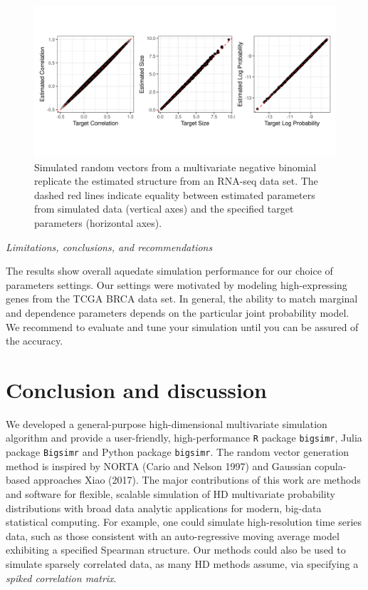 \documentclass{article}
\begin{document}
\begin{figure}
\includegraphics[width=0.8\linewidth]{ch050-figBRCA} \caption{\label{fig:ch050-figBRCA}Simulated random vectors from a multivariate negative binomial replicate the estimated structure from an RNA-seq data set. The dashed red lines indicate equality between estimated parameters from simulated data (vertical axes) and the specified target parameters (horizontal axes).}\label{fig:ch050-figBRCA}
\end{figure}

\emph{Limitations, conclusions, and recommendations}

The results show overall aquedate simulation performance for our choice
of parameters settings. Our settings were motivated by modeling
high-expressing genes from the TCGA BRCA data set. In general, the
ability to match marginal and dependence parameters depends on the
particular joint probability model. We recommend to evaluate and tune
your simulation until you can be assured of the accuracy.

\hypertarget{discussion}{%
\section{Conclusion and discussion}\label{discussion}}

We developed a general-purpose high-dimensional multivariate simulation
algorithm and provide a user-friendly, high-performance \texttt{R}
package \texttt{bigsimr}, Julia package \texttt{Bigsimr} and Python
package \texttt{bigsimr}. The random vector generation method is
inspired by NORTA (Cario and Nelson 1997) and Gaussian copula-based
approaches Xiao (2017). The major contributions of this work are methods
and software for flexible, scalable simulation of HD multivariate
probability distributions with broad data analytic applications for
modern, big-data statistical computing. For example, one could simulate
high-resolution time series data, such as those consistent with an
auto-regressive moving average model exhibiting a specified Spearman
structure. Our methods could also be used to simulate sparsely
correlated data, as many HD methods assume, via specifying a
\emph{spiked correlation matrix}.
\end{document}
